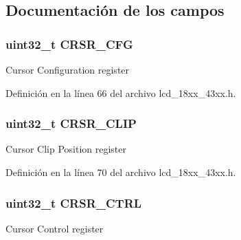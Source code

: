 \subsection{Documentación de los campos}
\subsubsection[{\texorpdfstring{C\+R\+S\+R\+\_\+\+C\+FG}{CRSR_CFG}}]{ uint32\+\_\+t C\+R\+S\+R\+\_\+\+C\+FG}\hypertarget{struct_l_p_c___l_c_d___t_ab2f4fb1ee13cf47013ae3c45f23b95b8}{}\label{struct_l_p_c___l_c_d___t_ab2f4fb1ee13cf47013ae3c45f23b95b8}
Cursor Configuration register 

Definición en la línea 66 del archivo lcd\+\_\+18xx\+\_\+43xx.\+h.

\subsubsection[{\texorpdfstring{C\+R\+S\+R\+\_\+\+C\+L\+IP}{CRSR_CLIP}}]{ uint32\+\_\+t C\+R\+S\+R\+\_\+\+C\+L\+IP}\hypertarget{struct_l_p_c___l_c_d___t_a5d2648ef26085c34f0898113ef0361a5}{}\label{struct_l_p_c___l_c_d___t_a5d2648ef26085c34f0898113ef0361a5}
Cursor Clip Position register 

Definición en la línea 70 del archivo lcd\+\_\+18xx\+\_\+43xx.\+h.

\subsubsection[{\texorpdfstring{C\+R\+S\+R\+\_\+\+C\+T\+RL}{CRSR_CTRL}}]{ uint32\+\_\+t C\+R\+S\+R\+\_\+\+C\+T\+RL}\hypertarget{struct_l_p_c___l_c_d___t_afdd0ebdbe9055dd1c42d61043772c26d}{}\label{struct_l_p_c___l_c_d___t_afdd0ebdbe9055dd1c42d61043772c26d}
Cursor Control register 

